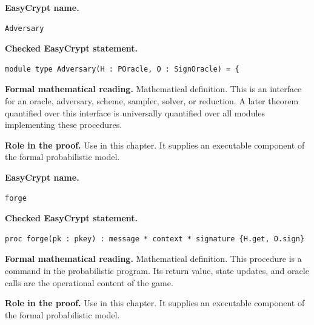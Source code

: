 \begin{formaldefinition}
\noindent\textbf{EasyCrypt name.}
\begin{lstlisting}[language=EasyCrypt,basicstyle=\ttfamily\scriptsize]
Adversary
\end{lstlisting}
\noindent\textbf{Checked EasyCrypt statement.}
\begin{lstlisting}[language=EasyCrypt,basicstyle=\ttfamily\scriptsize]
module type Adversary(H : POracle, O : SignOracle) = {
\end{lstlisting}
\noindent\textbf{Formal mathematical reading.}
Mathematical definition. This is an interface for an oracle, adversary, scheme, sampler, solver, or reduction.  A later theorem quantified over this interface is universally quantified over all modules implementing these procedures.

\noindent\textbf{Role in the proof.}
Use in this chapter. It supplies an executable component of the formal probabilistic model.

\end{formaldefinition}

\begin{formaldefinition}
\noindent\textbf{EasyCrypt name.}
\begin{lstlisting}[language=EasyCrypt,basicstyle=\ttfamily\scriptsize]
forge
\end{lstlisting}
\noindent\textbf{Checked EasyCrypt statement.}
\begin{lstlisting}[language=EasyCrypt,basicstyle=\ttfamily\scriptsize]
proc forge(pk : pkey) : message * context * signature {H.get, O.sign}
\end{lstlisting}
\noindent\textbf{Formal mathematical reading.}
Mathematical definition. This procedure is a command in the probabilistic program.  Its return value, state updates, and oracle calls are the operational content of the game.

\noindent\textbf{Role in the proof.}
Use in this chapter. It supplies an executable component of the formal probabilistic model.

\end{formaldefinition}

